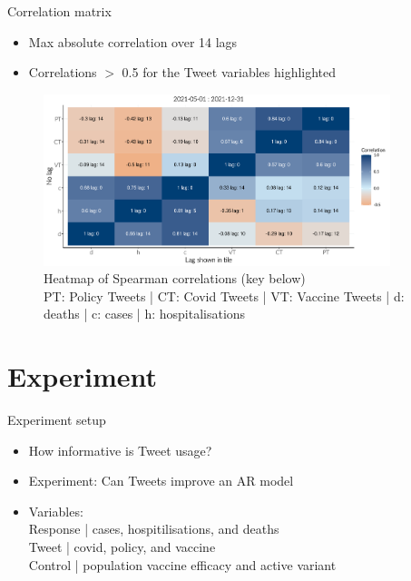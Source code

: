 \documentclass{beamer}
\begin{document}
 \begin{frame}{Correlation matrix} 
  \begin{itemize}
  \item Max absolute correlation over 14 lags
  \item Correlations $>$ 0.5 for the Tweet variables highlighted
  \end{itemize}
  
  \begin{figure}[!ht]
    \centering
    \includegraphics[width=0.9\textwidth]{figures/rrs_heatmap_formatted_wave3.pdf}
    \caption{Heatmap of Spearman correlations (key below)\\PT: Policy Tweets | CT: Covid Tweets | VT: Vaccine Tweets | d: deaths | c: cases | h: hospitalisations}
  \end{figure} 
\end{frame}


\section{Experiment}
\begin{frame}{Experiment setup}
  \begin{itemize}
  \item How informative is Tweet usage? \\[10pt]
  \item Experiment: Can Tweets improve an AR model \\[10pt]
  \item Variables: \\[5pt]
    Response | cases, hospitilisations, and deaths \\[5pt]  
    Tweet \hspace{0.5cm}| covid, policy, and vaccine \\[5pt] 
    Control \hspace{0.125cm}  | population vaccine efficacy and active variant
  \end{itemize}
\end{frame}
\end{document}
